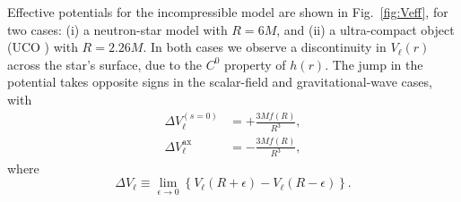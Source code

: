 \documentclass[aps,prd,longbibliography,reprint,twocolumn,amsmath,amssymb,amsfonts,showpacs,superscriptaddress]{revtex4-1}%
\begin{document}
Effective potentials for the incompressible model are shown in Fig.~\ref{fig:Veff}, for two cases: (i) a neutron-star model with $R = 6M$, and (ii) a ultra-compact object (UCO \cite{Macedo:2018yoi}) with $R = 2.26M$. %
In both cases we observe a discontinuity in $V_{\ell}(r)$ across the star's surface, due to the $C^0$ property of $h(r)$. The jump in the potential takes opposite signs in the scalar-field and gravitational-wave cases, with
\begin{subequations}
\begin{align}
\Delta V_{\ell}^{(s=0)} &= + \frac{3Mf(R)}{R^3} , \\
\Delta V_{\ell}^{\text{ax}} &= - \frac{3Mf(R)}{R^3} ,
\end{align}
\end{subequations}
where
\begin{equation}
\Delta V_{\ell} \equiv \lim_{\epsilon \rightarrow 0} \left\{ V_{\ell}(R + \epsilon) - V_{\ell}(R - \epsilon) \right\} . \label{def:DeltaV}
\end{equation}
\end{document}

